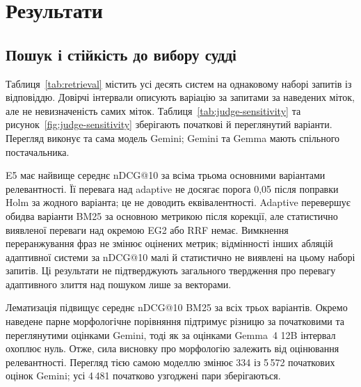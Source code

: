 \section{Результати}\label{sec:results}


\subsection{Пошук і стійкість до вибору судді}
Таблиця~\ref{tab:retrieval} містить усі десять систем на однаковому наборі запитів із відповіддю. Довірчі інтервали описують варіацію за запитами за наведених міток, але не невизначеність самих міток. Таблиця~\ref{tab:judge-sensitivity} та рисунок~\ref{fig:judge-sensitivity} зберігають початкові й переглянутий варіанти. Перегляд виконує та сама модель Gemini; Gemini та Gemma мають спільного постачальника.

E5 має найвище середнє nDCG@10 за всіма трьома основними варіантами релевантності. Її перевага над adaptive не досягає порога 0,05 після поправки Holm за жодного варіанта; це не доводить еквівалентності. Adaptive перевершує обидва варіанти BM25 за основною метрикою після корекції, але статистично виявленої переваги над окремою EG2 або RRF немає. Вимкнення переранжування фраз не змінює оцінених метрик; відмінності інших абляцій адаптивної системи за nDCG@10 малі й статистично не виявлені на цьому наборі запитів. Ці результати не підтверджують загального твердження про перевагу адаптивного злиття над пошуком лише за векторами.

Лематизація підвищує середнє nDCG@10 BM25 за всіх трьох варіантів. Окремо наведене парне морфологічне порівняння підтримує різницю за початковими та переглянутими оцінками Gemini, тоді як за оцінками Gemma~4 12B інтервал охоплює нуль. Отже, сила висновку про морфологію залежить від оцінювання релевантності. Перегляд тією самою моделлю змінює 334 із 5\,572 початкових оцінок Gemini; усі 4\,481 початково узгоджені пари зберігаються.

\begin{table}[p]
\centering
\caption{Пошук документів за 170 запитами із відповіддю. Середні та 95\% бутстреп-інтервали за запитами відповідають оцінкам Gemini після перегляду розбіжностей тією самою моделлю. Дві частини зберігають усі п'ять метрик. Знак \textdagger{} позначає парну різницю з adaptive за скоригованого Holm $p<0.05$, не обов'язково поліпшення. R@100 визначено відносно пулу. E5 має менший текстовий набір кандидатів.}
\label{tab:retrieval}

\end{table}

